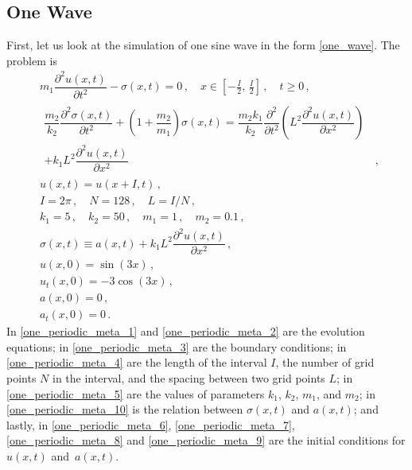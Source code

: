 \documentclass[11pt,a4paper,oneside,openright]{report} %
\begin{document}
\subsection{One Wave}
\noindent
First, let us look at the simulation of one sine wave in the form \eqref{one_wave}. The problem is
\begin{subequations}\label{}
    \begin{align}
        & m_1 \dfrac{\partial^2 u(x,t)}{\partial t^2} - \sigma(x,t)  = 0 \, , \quad x \in \left[- \frac{I}{2}, \, \frac{I}{2} \right] \, , \quad t \geq 0 \, , \label{one_periodic_meta_1} \\[5pt]
        & \begin{aligned}
            \dfrac{m_2}{k_2} \dfrac{\partial^2 \sigma(x,t)}{\partial t^2}  + \left(1 + \dfrac{m_2}{m_1} \right) \sigma(x,t) = \dfrac{m_2 k_1}{k_2} \dfrac{\partial^2 }{\partial t^2 } \left(L^2 \dfrac{\partial^2 u(x,t)}{\partial x^2} \right) & \\ + k_1 L^2 \dfrac{\partial^2 u(x,t)}{\partial x^2} & \, ,
        \end{aligned}\label{one_periodic_meta_2} \\[5pt]
        & u(x, t) = u(x + I, t) \, , \label{one_periodic_meta_3} \\[5pt]
        & I = 2\pi \, , \quad N = 128 \, , \quad L = I/N \, , \label{one_periodic_meta_4} \\[5pt]
        & k_1 = 5 \, , \quad k_2 = 50 \, , \quad m_1 = 1 \, , \quad m_2 = 0.1 \, , \label{one_periodic_meta_5} \\[5pt]
        & \sigma(x,t) \equiv a(x,t) + k_1 L^2 \dfrac{\partial^2 u(x,t)}{\partial x^2} \, , \label{one_periodic_meta_10} \\[5pt]
        & u(x,0) = \sin{(3 x)} \, , \label{one_periodic_meta_6} \\[5pt]
        & u_t(x,0) =  - 3 \cos{(3x)} \, , \label{one_periodic_meta_7} \\[5pt]
        & a(x,0) = 0 \, , \label{one_periodic_meta_8} \\[5pt]
        & a_t(x,0) = 0 \, . \label{one_periodic_meta_9}
    \end{align}
\end{subequations}
In \eqref{one_periodic_meta_1} and \eqref{one_periodic_meta_2} are the evolution equations; in \eqref{one_periodic_meta_3} are the boundary conditions; in \eqref{one_periodic_meta_4} are the length of the interval $I$, the number of grid points $N$ in the interval, and the spacing between two grid points $L$; in \eqref{one_periodic_meta_5} are the values of parameters $k_1$, $k_2$, $m_1$, and $m_2$; in \eqref{one_periodic_meta_10} is the relation between $\sigma(x,t)$ and $a(x,t)$; and lastly, in \eqref{one_periodic_meta_6}, \eqref{one_periodic_meta_7}, \eqref{one_periodic_meta_8} and \eqref{one_periodic_meta_9} are the initial conditions for $u(x,t)$ and~$a(x,t)$.
\end{document}
